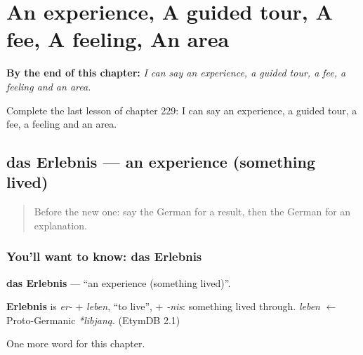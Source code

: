 
\chapter{An experience, A guided tour, A fee, A feeling, An area}
\label{ch:ge-an-experience-a-guided-tour-a-fee-a-feeling-an-area}

\begin{chapteropening}
\textbf{By the end of this chapter:} \emph{I can say an experience, a guided tour, a fee, a feeling and an area.}

Complete the last lesson of chapter 229: I can say an experience, a guided tour, a fee, a feeling and an area.
\end{chapteropening}

\section[das Erlebnis]{das Erlebnis — an experience (something lived)}

\label{lesson:GE-C229-erlebnis}



\begin{quote}
Before the new one: say the German for a result, then the German for an explanation.
\end{quote}

\subsection*{You'll want to know: das Erlebnis}
\textbf{das Erlebnis} — \textquotedblleft{}an experience (something lived)\textquotedblright{}.

\begin{cousinweb}
\textbf{Erlebnis} is \emph{er-} + \emph{leben}, \textquotedblleft{}to live\textquotedblright{}, + \emph{-nis}: something lived through. \emph{leben} $\leftarrow$ Proto-Germanic \emph{*libjaną}. (EtymDB 2.1)
\end{cousinweb}

\begin{grammarlens}[title={What you've built}]
One more word for this chapter.
\end{grammarlens}

